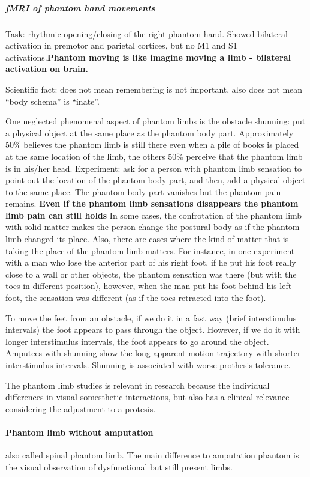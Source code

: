 \documentclass[12pt,article,oneside,a4paper]{memoir}
\begin{document}
\subparagraph{fMRI of phantom hand movements} Task: rhythmic opening/closing of the right phantom hand. Showed bilateral activation in premotor and parietal cortices, but no M1 and S1 activations.\textbf{Phantom moving is like imagine moving a limb - bilateral activation on brain.}
 
Scientific fact: does not mean remembering is not important, also does not mean ``body schema'' is ``inate''.

One neglected phenomenal aspect of phantom limbs is the obstacle shunning: put a physical object at the same place as the phantom body part. Approximately 50\% believes the phantom limb is still there even when a pile of books is placed at the same location of the limb, the others 50\% perceive that the phantom limb is in his/her head. Experiment: ask for a person with phantom limb sensation to point out the location of the phantom body part, and then, add a physical object to the same place. The phantom body part vanishes but the phantom pain remains. \textbf{Even if the phantom limb sensations disappears the phantom limb pain can still holds} In some cases, the confrotation of the phantom limb with solid matter makes the person change the postural body as if the phantom limb changed its place. Also, there are cases where the kind of matter that is taking the place of the phantom limb matters. For instance, in one experiment with a man who lose the anterior part of his right foot, if he put his foot really close to a wall or other objects, the phantom sensation was there (but with the toes in different position), however, when the man put his foot behind his left foot, the sensation was different (as if the toes retracted into the foot).

To move the feet from an obstacle, if we do it in a fast way (brief interstimulus intervals) the foot appears to pass through the object. However, if we do it with longer interstimulus intervals, the foot appears to go around the object.
Amputees with shunning show the long apparent motion trajectory with shorter interstimulus intervals. Shunning is associated with worse prothesis tolerance.

The phantom limb studies is relevant in research because the individual differences in visual-somesthetic interactions, but also has a clinical relevance considering the adjustment to a protesis.

\paragraph{Phantom limb without amputation} also called spinal phantom limb. The main difference to amputation phantom is the visual observation of dysfunctional but still present limbs. 
\end{document}
